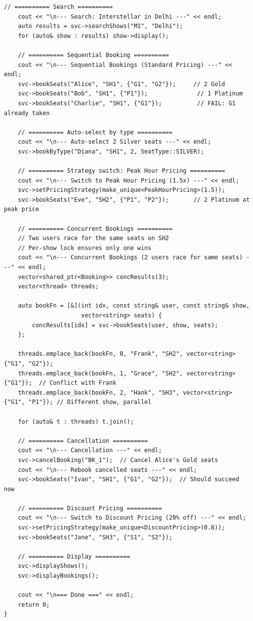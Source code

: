 \documentclass[11pt,a4paper]{article}
\begin{document}
\begin{lstlisting}[title={\texttt{main.cpp}}]
    // ========== Search ==========
    cout << "\n--- Search: Interstellar in Delhi ---" << endl;
    auto results = svc->searchShows("M1", "Delhi");
    for (auto& show : results) show->display();

    // ========== Sequential Booking ==========
    cout << "\n--- Sequential Bookings (Standard Pricing) ---" << endl;
    svc->bookSeats("Alice", "SH1", {"G1", "G2"});     // 2 Gold
    svc->bookSeats("Bob", "SH1", {"P1"});              // 1 Platinum
    svc->bookSeats("Charlie", "SH1", {"G1"});          // FAIL: G1 already taken

    // ========== Auto-select by type ==========
    cout << "\n--- Auto-select 2 Silver seats ---" << endl;
    svc->bookByType("Diana", "SH1", 2, SeatType::SILVER);

    // ========== Strategy switch: Peak Hour Pricing ==========
    cout << "\n--- Switch to Peak Hour Pricing (1.5x) ---" << endl;
    svc->setPricingStrategy(make_unique<PeakHourPricing>(1.5));
    svc->bookSeats("Eve", "SH2", {"P1", "P2"});       // 2 Platinum at peak price

    // ========== Concurrent Bookings ==========
    // Two users race for the same seats on SH2
    // Per-show lock ensures only one wins
    cout << "\n--- Concurrent Bookings (2 users race for same seats) ---" << endl;
    vector<shared_ptr<Booking>> concResults(3);
    vector<thread> threads;

    auto bookFn = [&](int idx, const string& user, const string& show,
                      vector<string> seats) {
        concResults[idx] = svc->bookSeats(user, show, seats);
    };

    threads.emplace_back(bookFn, 0, "Frank", "SH2", vector<string>{"G1", "G2"});
    threads.emplace_back(bookFn, 1, "Grace", "SH2", vector<string>{"G1"});  // Conflict with Frank
    threads.emplace_back(bookFn, 2, "Hank", "SH3", vector<string>{"G1", "P1"}); // Different show, parallel

    for (auto& t : threads) t.join();

    // ========== Cancellation ==========
    cout << "\n--- Cancellation ---" << endl;
    svc->cancelBooking("BK_1");  // Cancel Alice's Gold seats
    cout << "\n--- Rebook cancelled seats ---" << endl;
    svc->bookSeats("Ivan", "SH1", {"G1", "G2"});  // Should succeed now

    // ========== Discount Pricing ==========
    cout << "\n--- Switch to Discount Pricing (20% off) ---" << endl;
    svc->setPricingStrategy(make_unique<DiscountPricing>(0.8));
    svc->bookSeats("Jane", "SH3", {"S1", "S2"});

    // ========== Display ==========
    svc->displayShows();
    svc->displayBookings();

    cout << "\n=== Done ===" << endl;
    return 0;
}
\end{lstlisting}
\end{document}
